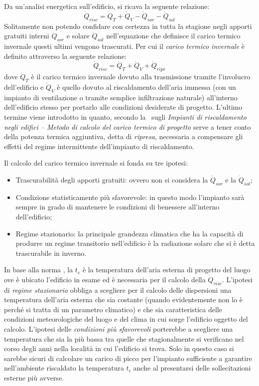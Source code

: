 Da un'analisi energetica sull'edificio, si ricava la seguente relazione:
\begin{equation}
	\dot{Q}_{risc}=\dot{Q}_T+\dot{Q}_V-\dot{Q}_{sor}-\dot{Q}_{sol}
\end{equation}
Solitamente non potendo confidare con certezza in tutta la stagione negli apporti gratuiti interni $\dot{Q}_{sor}$ e solare $\dot{Q}_{sol}$ nell'equazione che definisce il carico termico invernale questi ultimi vengono trascurati. Per cui il \emph{carico termico invernale} è definito attraverso la seguente relazione:
\begin{equation}
\label{caricotermico:invernale}
\dot{Q}_{risc}=\dot{Q}_T+\dot{Q}_V+\dot{Q}_{ripr}
\end{equation}
dove $\dot{Q}_T$ è il carico termico invernale dovuto alla trasmissione tramite l'involucro dell'edificio e $\dot{Q}_V$ è quello dovuto al riscaldamento dell'aria immessa (con un impianto di ventilazione o tramite semplice infiltrazione naturale) all'interno dell'edificio stesso per portarlo alle condizioni desiderate di progetto. L'ultimo termine viene introdotto in quanto, secondo la \norinv\ sugli \emph{Impianti di riscaldamento negli edifici -- Metodo di calcolo del carico termico di progetto} serve a tener conto della potenza termica aggiuntiva, detta di \emph{ripresa}, necessaria a compensare gli effetti del regime intermittente dell'impianto di riscaldamento.

Il calcolo del carico termico invernale si fonda su tre ipotesi:
\begin{itemize}
	\item Trascurabilità degli apporti gratuiti: ovvero non si considera la $\dot{Q}_{sor}$ e la $\dot{Q}_{sol}$;
	\item Condizione statisticamente più sfavorevole: in questo modo l'impianto sarà sempre in grado di mantenere le condizioni di benessere all'interno dell'edificio;
	\item Regime stazionario: la principale grandezza climatica che ha la capacità di produrre un regime transitorio nell'edificio è la radiazione solare che si è detta trascurabile in inverno.
\end{itemize}

In base alla norma \norinv, la $t_e$ è la temperatura dell'aria esterna di progetto del luogo ove è ubicato l'edificio in esame ed è necessaria per il calcolo della $\dot{Q}_{risc}$. L'ipotesi di \emph{regime stazionario} obbliga a scegliere per il calcolo delle dispersioni una temperatura dell'aria esterna che sia costante (quando evidentemente non lo è perché si tratta di un parametro climatico) e che sia caratteristica delle condizioni meteorologiche del luogo e del clima in cui sorge l'edificio oggetto del calcolo. L'ipotesi delle \emph{condizioni più sfavorevoli} porterebbe a scegliere una temperatura che sia la più bassa tra quelle che stagionalmente si verificano nel corso degli anni nella località in cui l'edificio si trova. Solo in questo caso si sarebbe sicuri di calcolare un carico di picco per l'impianto sufficiente a garantire nell'ambiente riscaldato la temperatura $t_i$ anche al presentarsi delle sollecitazioni esterne più avverse.

